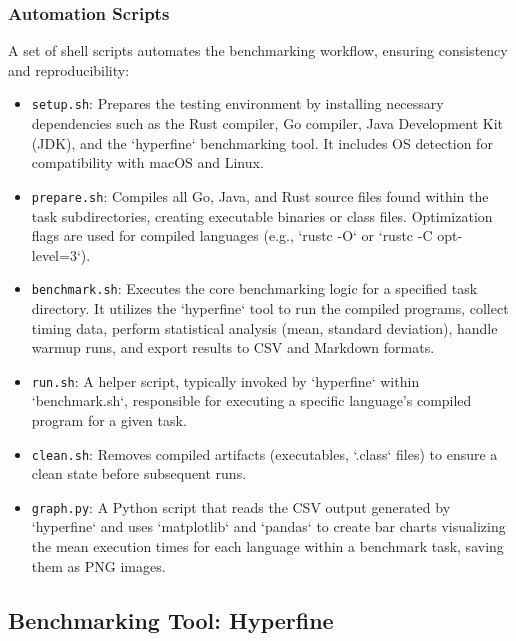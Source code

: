 \documentclass{article}
\begin{document}
\subsubsection{Automation Scripts}
A set of shell scripts automates the benchmarking workflow, ensuring consistency and reproducibility:
\begin{itemize}
    \item \texttt{setup.sh}: Prepares the testing environment by installing necessary dependencies such as the Rust compiler, Go compiler, Java Development Kit (JDK), and the `hyperfine` benchmarking tool. It includes OS detection for compatibility with macOS and Linux.
    \item \texttt{prepare.sh}: Compiles all Go, Java, and Rust source files found within the task subdirectories, creating executable binaries or class files. Optimization flags are used for compiled languages (e.g., `rustc -O` or `rustc -C opt-level=3`).
    \item \texttt{benchmark.sh}: Executes the core benchmarking logic for a specified task directory. It utilizes the `hyperfine` tool to run the compiled programs, collect timing data, perform statistical analysis (mean, standard deviation), handle warmup runs, and export results to CSV and Markdown formats.
    \item \texttt{run.sh}: A helper script, typically invoked by `hyperfine` within `benchmark.sh`, responsible for executing a specific language's compiled program for a given task.
    \item \texttt{clean.sh}: Removes compiled artifacts (executables, `.class` files) to ensure a clean state before subsequent runs.
    \item \texttt{graph.py}: A Python script that reads the CSV output generated by `hyperfine` and uses `matplotlib` and `pandas` to create bar charts visualizing the mean execution times for each language within a benchmark task, saving them as PNG images.
\end{itemize}

\subsection{Benchmarking Tool: Hyperfine}
\end{document}
